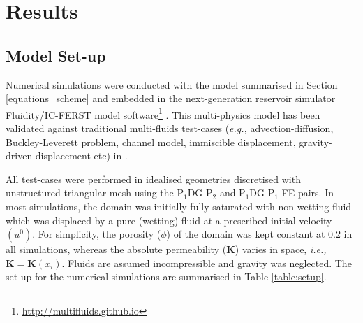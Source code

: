 \documentclass[preprint,authoryear,12pt]{elsarticle}
\newcommand{\PN}[2][error]{P$_{#1}$DG-P$_{#2}$}
\newcommand{\eg}{{\it e.g., }}
\newcommand{\ie}{{\it i.e., }}
\begin{document}


%



\section{Results}\label{section:results} 

\subsection{Model Set-up}\label{section:results:setup}

Numerical simulations were conducted with the model summarised in Section \ref{equations_scheme} and embedded in the next-generation reservoir simulator Fluidity/IC-FERST model software\footnote{\href{http://multifluids.github.io}{http://multifluids.github.io}} \citep[a full description of the model can be found in][]{porosity_documentation,fluidity_manual,jackson_2013,gomes_2017}. This multi-physics model has been validated against traditional multi-fluids test-cases (\eg advection-diffusion, Buckley-Leverett problem, channel model, immiscible displacement, gravity-driven displacement etc) in \citet{radunz_2014,jackson_2015,salinas2015,pavlidis2016}.
 
\medskip
All test-cases were performed in idealised geometries discretised with unstructured triangular mesh using the \PN[1]{2} and \PN[1]{1} FE-pairs. In most simulations, the domain was initially fully saturated with non-wetting fluid which was displaced by a pure (wetting) fluid at a prescribed initial velocity $\left(u^{0}\right)$. For simplicity, the porosity ($\phi$) of the domain was kept constant at 0.2 in all simulations, whereas the absolute permeability ($\mathbf{K}$) varies in space, \ie $\mathbf{K}=\mathbf{K}\left(x_{i}\right)$. Fluids are assumed incompressible and gravity was neglected. The set-up for the numerical simulations are summarised in Table \ref{table:setup}.
 
\end{document}
